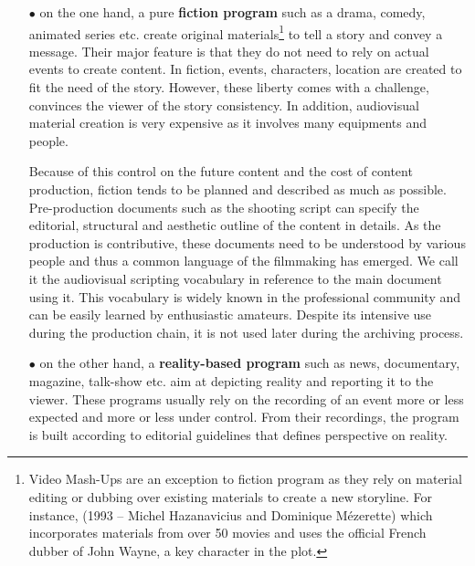 \begin{itemize}
	\item[$\bullet$] on the one hand, a pure \textbf{fiction program} such as a drama, comedy, animated series etc. create original materials\footnote{Video Mash-Ups are an exception to fiction program as they rely on material editing or dubbing over existing materials to create a new storyline. For instance,  (1993 -- Michel Hazanavicius and Dominique Mézerette) which incorporates materials from over 50 movies and uses the official French dubber of John Wayne, a key character in the plot.} to tell a story and convey a message. Their major feature is that they do not need to rely on actual events to create content. In fiction, events, characters, location are created to fit the need of the story. However, these liberty comes with a challenge, convinces the viewer of the story consistency. In addition, audiovisual material creation is very expensive as it involves many equipments and people. 

Because of this control on the future content and the cost of content production, fiction tends to be planned and described as much as possible. Pre-production documents such as the shooting script can specify the editorial, structural and aesthetic outline of the content in details. As the production is contributive, these documents need to be understood by various people and thus a common language of the filmmaking has emerged. We call it the audiovisual scripting vocabulary in reference to the main document using it. This vocabulary is widely known in the professional community and can be easily learned by enthusiastic amateurs. Despite its intensive use during the production chain, it is not used later during the archiving process. 

	\item[$\bullet$] on the other hand, a \textbf{reality-based program} such as news, documentary, magazine, talk-show etc. aim at depicting reality and reporting it to the viewer. These programs usually rely on the recording of an event more or less expected and more or less under control. From their recordings, the program is built according to editorial guidelines that defines perspective on reality.
	

\end{itemize}
